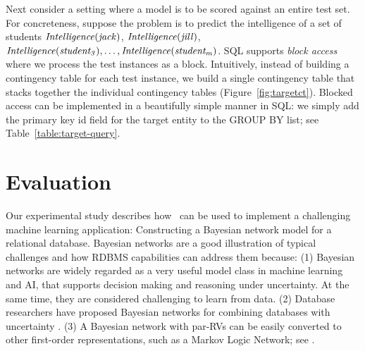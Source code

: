 \documentclass{IEEEtran}
\begin{document}
%
Next consider a setting where a model is to be scored against an entire test set. 
For concreteness, suppose the problem is to predict the intelligence of a set of students
 $\it{Intelligence}(jack)$, $\it{Intelligence}(jill)$,
 $\it{Intelligence}(student_{3}),\ldots, \it{Intelligence}(student_{m})$.
 SQL supports {\em block access} where we process the test instances as a block. Intuitively, instead of building a contingency table for each test instance, we build a single contingency table that stacks together the individual contingency tables (Figure~\ref{fig:targetct}). Blocked access can be implemented in a beautifully simple manner in SQL: we simply add the primary key id field for the target entity to the GROUP BY list; see Table~\ref{table:target-query}. 

\section{Evaluation} 

Our experimental study describes how \FB\ can be used to implement a challenging machine learning application: Constructing a Bayesian network model for a relational database. Bayesian networks are a good illustration of typical challenges and how RDBMS capabilities can address them because: (1) Bayesian networks are widely regarded as a very useful model class in machine learning and AI, that supports decision making and reasoning under uncertainty. At the same time, they are considered challenging to learn from data. (2) Database researchers have proposed Bayesian networks for combining databases with uncertainty %
\cite{Wang2008}. (3) A Bayesian network with par-RVs can be easily converted to other first-order representations, such as a Markov Logic Network; see \cite{Domingos2009}.
\end{document}
